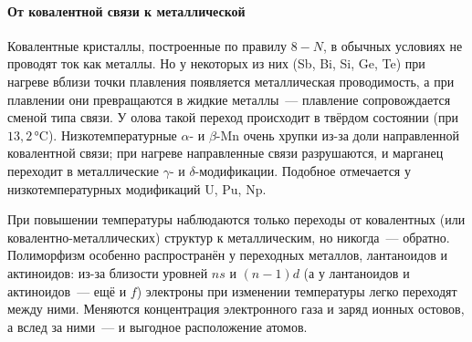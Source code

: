 \paragraph{От ковалентной связи к металлической}
Ковалентные кристаллы, построенные по правилу $8-N$, в обычных условиях
не проводят ток как металлы. Но у некоторых из них (Sb, Bi, Si, Ge, Te)
при нагреве вблизи точки плавления появляется металлическая
проводимость, а при плавлении они превращаются в жидкие металлы~—
плавление сопровождается сменой типа связи. У олова такой переход
происходит в твёрдом состоянии (при $13{,}2$\,°C). Низкотемпературные
$\alpha$- и $\beta$-Mn очень хрупки из-за доли направленной ковалентной
связи; при нагреве направленные связи разрушаются, и марганец переходит в
металлические $\gamma$- и $\delta$-модификации. Подобное отмечается у
низкотемпературных модификаций U, Pu, Np.

\begin{glavnoe}
При повышении температуры наблюдаются только переходы от ковалентных
(или ковалентно-металлических) структур к металлическим, но никогда~—
обратно. Полиморфизм особенно распространён у переходных металлов,
лантаноидов и актиноидов: из-за близости уровней $ns$ и $(n-1)d$ (а у
лантаноидов и актиноидов~— ещё и $f$) электроны при изменении
температуры легко переходят между ними. Меняются концентрация
электронного газа и заряд ионных остовов, а вслед за ними~— и
выгодное расположение атомов.
\end{glavnoe}
